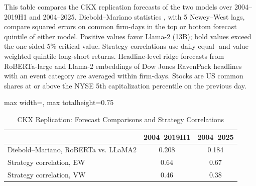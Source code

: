\begin{table}[htbp]
\centering
\caption{CKX Replication: Forecast Comparisons and Strategy Correlations}
\label{tab:tabR2_ckx_dm}
\begin{minipage}{\linewidth}\footnotesize
This table compares the CKX replication forecasts of the two models over 2004--2019H1 and 2004--2025. Diebold--Mariano statistics \citep{diebold2002comparing}, with 5 Newey--West lags, compare squared errors on common firm-days in the top or bottom forecast quintile of either model. Positive values favor Llama-2 (13B); bold values exceed the one-sided 5\% critical value. Strategy correlations use daily equal- and value-weighted quintile long-short returns. Headline-level ridge forecasts from RoBERTa-large and Llama-2 embeddings of Dow Jones RavenPack headlines with an event category are averaged within firm-days. Stocks are US common shares at or above the NYSE 5th capitalization percentile on the previous day.
\end{minipage}
\medskip

{\footnotesize
\begin{adjustbox}{max width=\linewidth, max totalheight=0.75\textheight}
\begin{tabular}{lcc}
\toprule
 & 2004--2019H1 & 2004--2025 \\
\midrule
Diebold--Mariano, RoBERTa vs. LLaMA2 & 0.208 & 0.184 \\
Strategy correlation, EW & 0.64\phantom{0} & 0.67\phantom{0} \\
Strategy correlation, VW & 0.46\phantom{0} & 0.38\phantom{0} \\
\bottomrule
\end{tabular}
\end{adjustbox}
}
\end{table}
